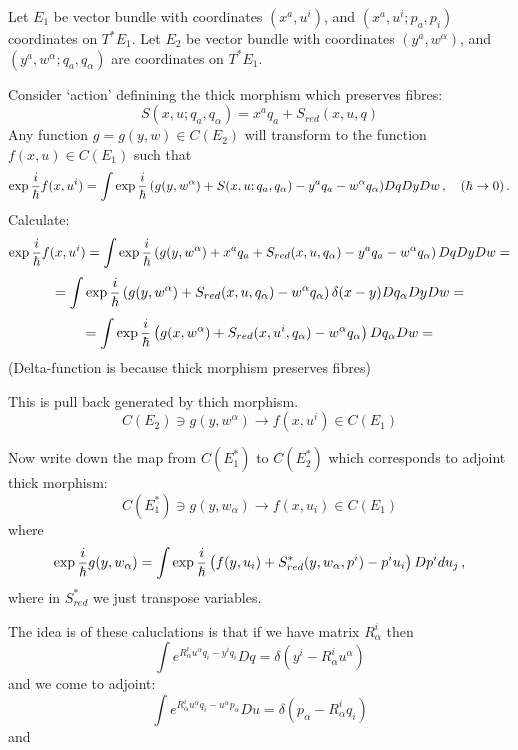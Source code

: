 

\baselineskip=14pt
\def\vare {\varepsilon}
\def\t {\tilde}
\def\a {\alpha}
\def\K {{\bf K}}
\def\N {{\bf N}}
\def\C {{\cal C}}
\def\L {{\cal L}}
\def\E {{\bf E}}
\def\s {{\sigma}}
\def\S {{\Sigma}}
\def\p{\partial}
\def\vare{{\varepsilon}}
\def\Q {{\bf Q}}
\def\D {{\cal D}}
\def\G {{\Gamma}}
\def\Z {{\bf Z}}
\def\R  {{\bf R}}
\def\l {\lambda}
\def\ll {{\bf l}}
\def\degree {{\bf {\rm degree}\,\,}}
\def \finish {${\,\,\vrule height1mm depth2mm width 8pt}$}
\def \m {\medskip}
\def\p {\partial}
\def\r {{\bf r}}
\def\pt {{\bf p}}
\def\v {{\bf v}}
\def\n {{\bf n}}
\def\t {{\bf t}}
\def\b {{\bf b}}
\def\c {{\bf c }}
\def\e{{\bf e}}
\def\f{{\bf f}}
\def\ac {{\bf a}}
\def \X   {{\bf X}}
\def \Y   {{\bf Y}}
\def \x   {{\bf x}}
\def \y   {{\bf y}}
\def\w {{\omega}}
\def \Tr  {{\rm Tr\,}}
\def\dim {{\rm dim\,\,}}
\def\t {{\tilde}} 
\def\dist {{\hbox{\tt "distance"}}}
\def  \dim {{\rm dim\,}}
\def  \Im  {{\rm Im\,}}
\def  \ker {{\rm ker\,}}
Let $E_1$  be vector bundle with coordinates
$(x^a,u^i)$,  and  $(x^a,u^i;p_a,p_i)$  coordinates
on $T^* E_1$.
Let $E_2$  be vector bundle with coordinates
$(y^a,w^\a)$,  and  $(y^a,w^\a;q_a,q_\a)$  are coordinates
on $T^* E_1$.

  Consider `action' definining the thick morphism which
preserves  fibres:
     $$
S(x,u;q_a,q_\a)=x^aq_a+S_{red}(x,u,q)
     $$
     Any function $g=g(y,w)\in C(E_2)$
will transform to the function
$f(x,u)\in C(E_1)$  such that
      $$
\exp {{i\over \hbar}f(x,u^i)}=
\int \exp {{i\over \hbar}
  \left(
    g(y,w^\a)+S(x,u;q_a,q_\a)-y^aq_a-w^\a q_\a
     \right)
       }Dq  Dy Dw\,,\quad (\hbar\to 0)\,.
      $$
Calculate:
             $$
\exp {{i\over \hbar}f(x,u^i)}=
\int \exp 
     {i\over \hbar}
  \left(
    g(y,w^\a)+x^aq_a+S_{red}(x,u,q_\a)-y^aq_a-w^\a q_\a
     \right)DqDy Dw
        =
      $$
       $$
      =
\int \exp 
     {i\over \hbar}
  \left(
    g(y,w^\a)+S_{red}(x,u,q_\a)-w^\a q_\a
     \right)\delta (x-y)Dq_\a Dy Dw=
       $$
   $$
      =
\int \exp 
     {i\over \hbar}
  \left(
    g(x,w^\a)+S_{red}(x,u^i,q_\a)-w^\a q_\a
     \right)Dq_\a  Dw=
       $$
(Delta-function is because thick morphism preserves
fibres)

This is pull back generated by thich morphism.
       $$
C(E_2)\ni g(y,w^\a)\to f(x,u^i)\in C(E_1)
       $$
 
Now write down the map from $C(E_1^*)$  to $C(E_2^*)$
which corresponds to adjoint thick morphism:
       $$
C(E_1^*)\ni g(y,w_\a)\to f(x,u_i)\in C(E_1)
       $$
where
         $$
\exp {{i\over \hbar}g(y,w_\a)}=
\int \exp 
     {i\over \hbar}
  \left(
    f(y,u_i)+S^*_{red}(y,w_\a,p^i)-p^iu_i
     \right)Dp^idu_j\,,
            $$
where  in $S^*_{red}$  we just transpose variables.

The idea is of these caluclations is that
if we have matrix $R^i_\a$  then
     $$
\int e^{R^i_\a u^\a q_i-y^iq_i}Dq=\delta(y^i-R^i_\a u^\a)
     $$
and we come to adjoint:   
  $$
\int e^{R^i_\a u^\a q_i-u^\a p_\a}Du=
\delta(p_\a-R^i_\a q_i)
     $$
    and   
         
\bye
